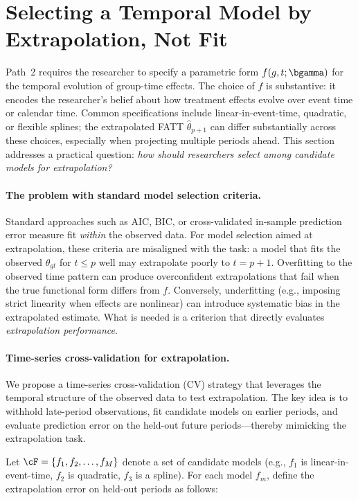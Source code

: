 \documentclass{article}
\begin{document}
\section{Selecting a Temporal Model by Extrapolation, Not Fit}\label{sec:model-selection}

Path~2 requires the researcher to specify a parametric form $f(g,t;\bgamma)$ for the temporal evolution of group-time effects. The choice of $f$ is substantive: it encodes the researcher's belief about how treatment effects evolve over event time or calendar time. Common specifications include linear-in-event-time, quadratic, or flexible splines; the extrapolated FATT $\widehat{\theta}_{p+1}$ can differ substantially across these choices, especially when projecting multiple periods ahead. This section addresses a practical question: \emph{how should researchers select among candidate models for extrapolation?}

\paragraph{The problem with standard model selection criteria.}
Standard approaches such as AIC, BIC, or cross-validated in-sample prediction error measure fit \emph{within} the observed data. For model selection aimed at extrapolation, these criteria are misaligned with the task: a model that fits the observed $\theta_{gt}$ for $t \leq p$ well may extrapolate poorly to $t = p+1$. Overfitting to the observed time pattern can produce overconfident extrapolations that fail when the true functional form differs from $f$. Conversely, underfitting (e.g., imposing strict linearity when effects are nonlinear) can introduce systematic bias in the extrapolated estimate. What is needed is a criterion that directly evaluates \emph{extrapolation performance}.

\paragraph{Time-series cross-validation for extrapolation.}
We propose a time-series cross-validation (CV) strategy that leverages the temporal structure of the observed data to test extrapolation. The key idea is to withhold late-period observations, fit candidate models on earlier periods, and evaluate prediction error on the held-out future periods---thereby mimicking the extrapolation task.

Let $\cF = \{f_1, f_2, \ldots, f_M\}$ denote a set of candidate models (e.g., $f_1$ is linear-in-event-time, $f_2$ is quadratic, $f_3$ is a spline). For each model $f_m$, define the extrapolation error on held-out periods as follows:
\end{document}
